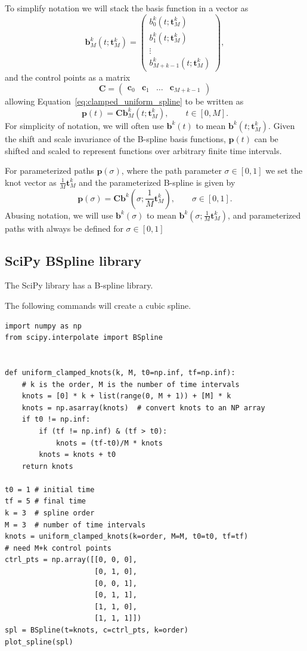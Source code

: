\documentclass{article}
\newcommand{\bbf}{\mathbf{b}}
\newcommand{\cbf}{\mathbf{c}}
\newcommand{\Cbf}{\mathbf{C}}
\begin{document}
To simplify notation we will stack the basis function in a vector as
\begin{equation}\label{eq:basis_vector}
\bbf_M^k(t;\mathbf{t}_M^k) = \begin{pmatrix} b_0^k(t;\mathbf{t}_M^k) \\ b_1^k(t;\mathbf{t}_M^k) \\ \vdots \\ b_{M+k-1}^k(t;\mathbf{t}_M^k) \end{pmatrix}, 
\end{equation}
and the control points as a matrix 
\[
\Cbf = \begin{pmatrix} \cbf_0 & \cbf_1 & \dots & \cbf_{M+k-1} \end{pmatrix}
\]
allowing Equation~\eqref{eq:clamped_uniform_spline} to be written as
\[
\mathbf{p}(t) = \Cbf \bbf_M^k(t; \mathbf{t}_M^k), \qquad t\in[0, M].
\]
For simplicity of notation, we will often use $\bbf^k(t)$ to mean $\bbf^k(t; \mathbf{t}_M^k)$.  Given the shift and scale invariance of the B-spline basis functions, $\mathbf{p}(t)$ can be shifted and scaled to represent functions over arbitrary finite time intervals.

For parameterized paths $\mathbf{p}(\sigma)$, where the path parameter $\sigma\in[0,1]$ we set the knot vector as $\frac{1}{M}\mathbf{t}_{M}^k$
and the parameterized B-spline is given by
\[
\mathbf{p}(\sigma) = \Cbf \bbf^k(\sigma; \frac{1}{M}\mathbf{t}_{M}^k), \qquad \sigma\in[0, 1].
\]
Abusing notation, we will use $\bbf^k(\sigma)$ to mean $\bbf^k(\sigma; \frac{1}{M}\mathbf{t}_{M}^k)$, and parameterized paths with always be defined for $\sigma\in[0,1]$

\subsection{SciPy BSpline library}
The SciPy library has a B-spline library.  

The following commands will create a cubic spline.
\begin{lstlisting}
import numpy as np
from scipy.interpolate import BSpline
	
	
def uniform_clamped_knots(k, M, t0=np.inf, tf=np.inf):
    # k is the order, M is the number of time intervals
    knots = [0] * k + list(range(0, M + 1)) + [M] * k
    knots = np.asarray(knots)  # convert knots to an NP array
    if t0 != np.inf:
        if (tf != np.inf) & (tf > t0):
            knots = (tf-t0)/M * knots
        knots = knots + t0
    return knots	

t0 = 1 # initial time
tf = 5 # final time
k = 3  # spline order
M = 3  # number of time intervals
knots = uniform_clamped_knots(k=order, M=M, t0=t0, tf=tf)
# need M+k control points
ctrl_pts = np.array([[0, 0, 0],  
                     [0, 1, 0],
                     [0, 0, 1],
                     [0, 1, 1],
                     [1, 1, 0],
                     [1, 1, 1]])
spl = BSpline(t=knots, c=ctrl_pts, k=order)
plot_spline(spl)
\end{lstlisting}
\end{document}
